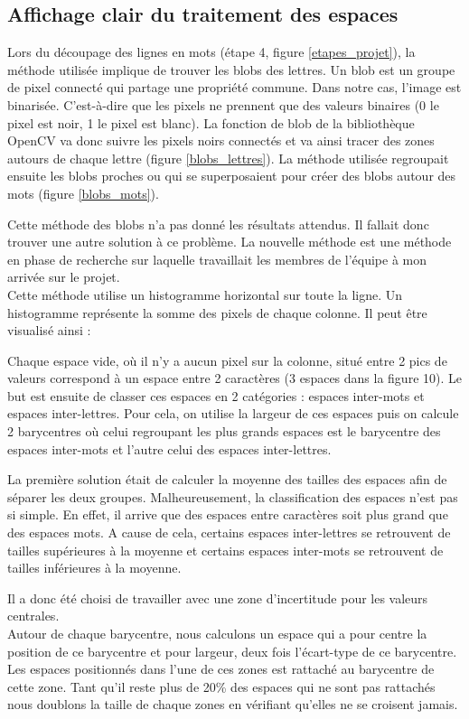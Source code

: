 \documentclass[12pt,a4paper]{article}
\begin{document}
\newpage
\subsection{Affichage clair du traitement des espaces}
Lors du découpage des lignes en mots (étape 4, figure \ref{etapes_projet}), la méthode utilisée implique de trouver les blobs des lettres. Un blob est un groupe de pixel connecté qui partage une propriété commune. Dans notre cas, l’image est binarisée. C’est-à-dire que les pixels ne prennent que des valeurs binaires (0 le pixel est noir, 1 le pixel est blanc). La fonction de blob de la bibliothèque OpenCV va donc suivre les pixels noirs connectés et va ainsi tracer des zones autours de chaque lettre (figure \ref{blobs_lettres}).\bigbreak
La méthode utilisée regroupait ensuite les blobs proches ou qui se superposaient pour créer des blobs autour des mots (figure \ref{blobs_mots}).\bigbreak



\newpage
Cette méthode des blobs n'a pas donné les résultats attendus. Il fallait donc trouver une autre solution à ce problème.\bigbreak
La nouvelle méthode est une méthode en phase de recherche sur laquelle travaillait les membres de l'équipe à mon arrivée sur le projet.\\
Cette méthode utilise un histogramme horizontal sur toute la ligne. Un histogramme représente la somme des pixels de chaque colonne. Il peut être visualisé ainsi :


\newpage
Chaque espace vide, où il n’y a aucun pixel sur la colonne, situé entre 2 pics de valeurs correspond à un espace entre 2 caractères (3 espaces dans la figure 10). Le but est ensuite de classer ces espaces en 2 catégories : espaces inter-mots et espaces inter-lettres. Pour cela, on utilise la largeur de ces espaces puis on calcule 2 barycentres où celui regroupant les plus grands espaces est le barycentre des espaces inter-mots et l’autre celui des espaces inter-lettres.



La première solution était de calculer la moyenne des tailles des espaces afin de séparer les deux groupes.
Malheureusement, la classification des espaces n’est pas si simple. En effet, il arrive que des espaces entre caractères soit plus grand que des espaces mots. A cause de cela, certains espaces inter-lettres se retrouvent de tailles supérieures à la moyenne et certains espaces inter-mots se retrouvent de tailles inférieures à la moyenne.\bigbreak

Il a donc été choisi de travailler avec une zone d’incertitude pour les valeurs centrales.\\
Autour de chaque barycentre, nous calculons un espace qui a pour centre la position de ce barycentre et pour largeur, deux fois l'écart-type de ce barycentre. Les espaces positionnés dans l'une de ces zones est rattaché au barycentre de cette zone. Tant qu'il reste plus de 20\% des espaces qui ne sont pas rattachés nous doublons la taille de chaque zones en vérifiant qu'elles ne se croisent jamais. \bigbreak
\end{document}
